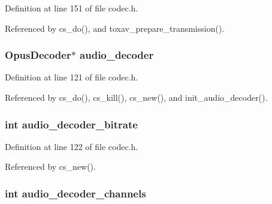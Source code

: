 Definition at line 151 of file codec.\+h.



Referenced by cs\+\_\+do(), and toxav\+\_\+prepare\+\_\+transmission().

\hypertarget{struct___c_s_session_a3b9ee5ac4c354a3e31a8acf7aa1a1b6c}{
\subsubsection[{audio\+\_\+decoder}]{\setlength{\rightskip}{0pt plus 5cm}Opus\+Decoder$\ast$ audio\+\_\+decoder}}\label{struct___c_s_session_a3b9ee5ac4c354a3e31a8acf7aa1a1b6c}


Definition at line 121 of file codec.\+h.



Referenced by cs\+\_\+do(), cs\+\_\+kill(), cs\+\_\+new(), and init\+\_\+audio\+\_\+decoder().

\hypertarget{struct___c_s_session_a56e0bd5af866e6ba91078960083ac801}{
\subsubsection[{audio\+\_\+decoder\+\_\+bitrate}]{\setlength{\rightskip}{0pt plus 5cm}int audio\+\_\+decoder\+\_\+bitrate}}\label{struct___c_s_session_a56e0bd5af866e6ba91078960083ac801}


Definition at line 122 of file codec.\+h.



Referenced by cs\+\_\+new().

\hypertarget{struct___c_s_session_a81fe9534366c7ea81e8ff6ac729d2ae9}{
\subsubsection[{audio\+\_\+decoder\+\_\+channels}]{\setlength{\rightskip}{0pt plus 5cm}int audio\+\_\+decoder\+\_\+channels}}\label{struct___c_s_session_a81fe9534366c7ea81e8ff6ac729d2ae9}


